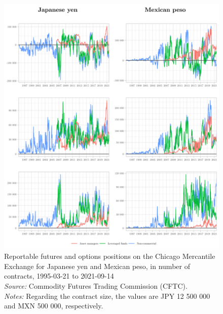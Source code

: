 \documentclass[a4paper, twoside]{templates/ociamthesis}
\begin{document}
\begin{figure}[!ht]

{\centering \includegraphics[width=0.99\columnwidth]{figure/GTOG_JPYMXN} 

}

\caption[Reportable futures and options positions on the Chicago Mercantile Exchange for Japanese yen and Mexican peso, in number of contracts, 1995-03-21 to 2021-09-14]{Reportable futures and options positions on the Chicago Mercantile Exchange for Japanese yen and Mexican peso, in number of contracts, 1995-03-21 to 2021-09-14 \\ \scriptsize \textit{Source:} Commodity Futures Trading Commission (CFTC). \\ \scriptsize \textit{Notes:} Regarding the contract size, the values are JPY 12 500 000 and MXN 500 000, respectively.}\label{fig:FigureA33}
\end{figure}

\clearpage
\end{document}

